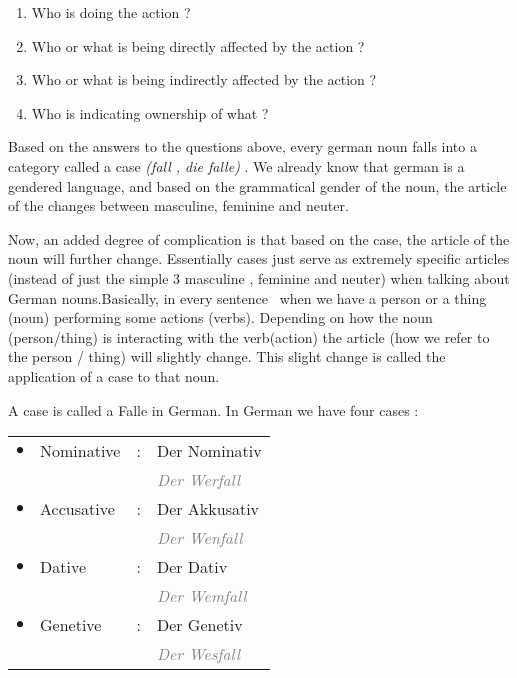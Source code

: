 \documentclass[a4paper,twocolumn,10pt]{article}
\newcommand{\bulletpoint}
{ $\bullet$  }
\newcommand{\newpar}
{\par \vspace{0.3cm}}
\begin{document}
\nolinenumbers
\begin{enumerate}[noitemsep]
	\item Who is doing the action ?
	\item Who or what is being directly affected by the action ?
	\item Who or what is being indirectly affected by the action ?
	\item Who is indicating ownership of what ?
\end{enumerate}
\linenumbers

Based on the answers to the questions above, every german noun falls into a
category called a case \textit{(fall , die falle)} . We already know that german
is a gendered language, and based on the grammatical gender of the noun, the
article of the changes between masculine, feminine and neuter.\newpar

Now, an added degree of complication is that based on the case, the article of
the noun will further change. Essentially cases just serve as extremely specific
articles (instead of just the simple 3 masculine , feminine and neuter) when
talking about German nouns.Basically, in every sentence  when we have a person
or a thing (noun) performing some actions (verbs). Depending on how the noun
(person/thing) is interacting with the verb(action) the article (how we refer to
the person / thing) will slightly change. This slight change is called the
application of a case to that noun.\newpar

A case is called a Falle in German.  In German we have four cases :

\nolinenumbers

\vspace{0.2cm}

\begin{tabularx}{0.95\linewidth}{lllX}

\rowcolor{white} \bulletpoint & \cellcolor{cell-lightred} Nominative    & : & Der Nominativ\\
\rowcolor{white}              &                                         &   & \textcolor{gray}{ \textit{Der Werfall} }\\
\rowcolor{white} \bulletpoint & \cellcolor{cell-lightyellow} Accusative & : & Der Akkusativ\\
\rowcolor{white}              &                                         &   & \textcolor{gray}{ \textit{Der Wenfall} }\\
\rowcolor{white} \bulletpoint & \cellcolor{cell-lightgreen} Dative      & : & Der Dativ\\
\rowcolor{white}              &                                         &   & \textcolor{gray}{ \textit{Der Wemfall} }\\
\rowcolor{white} \bulletpoint & \cellcolor{cell-lightblue} Genetive     & : & Der Genetiv\\
\rowcolor{white}              &                                         &   & \textcolor{gray}{ \textit{Der Wesfall} }\\

\end{tabularx}
\end{document}
